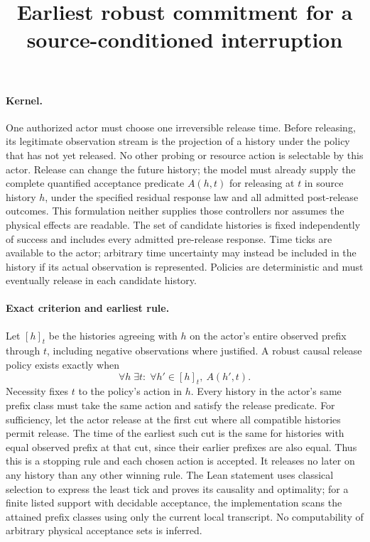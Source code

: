 \documentclass{article}
\begin{document}
\title{Earliest robust commitment for a source-conditioned interruption}
\maketitle

\paragraph{Kernel.}
One authorized actor must choose one irreversible release time.
Before releasing, its legitimate observation stream is the
projection of a history under the policy that has not yet released.
No other probing or resource action is selectable by this actor.
Release can change the future history; the model must already
supply the complete quantified acceptance predicate
\(A(h,t)\) for releasing at \(t\) in source history \(h\),
under the specified residual response law and all admitted
post-release outcomes. This formulation neither supplies those
controllers nor assumes the physical effects are readable. The
set of candidate histories is fixed independently of success and
includes every admitted pre-release response. Time ticks are
available to the actor; arbitrary time uncertainty may instead be
included in the history if its actual observation is represented.
Policies are deterministic and must eventually release in each
candidate history.

\paragraph{Exact criterion and earliest rule.}
Let \([h]_t\) be the histories agreeing with \(h\) on the
actor's entire observed prefix through \(t\), including negative
observations where justified. A robust causal release policy
exists exactly when
\[
 \forall h\;\exists t:\; \forall h'\in[h]_t,\ A(h',t).
\]
Necessity fixes \(t\) to the policy's action in \(h\).
Every history in the actor's same prefix class must take the same
action and satisfy the release predicate. For sufficiency, let
the actor release at the first cut where all compatible
histories permit release. The time of the earliest such cut is
the same for histories with equal observed prefix at that cut,
since their earlier prefixes are also equal.
Thus this is a stopping rule and each chosen action is accepted.
It releases no later on any history than any other winning rule.
The Lean statement uses classical selection to express the least
tick and proves its causality and optimality; for a finite listed
support with decidable acceptance, the implementation scans the
attained prefix classes using only the current local transcript.
No computability of arbitrary physical acceptance sets is inferred.
\end{document}
